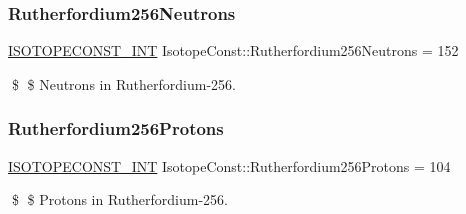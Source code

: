 \subsubsection{\texorpdfstring{Rutherfordium256\+Neutrons}{Rutherfordium256Neutrons}}
{\footnotesize\ttfamily \mbox{\hyperlink{group___isotope_const-_macros_ga5f18360b3e99483a35c32d789e62621c}{I\+S\+O\+T\+O\+P\+E\+C\+O\+N\+S\+T\+\_\+\+I\+NT}} Isotope\+Const\+::\+Rutherfordium256\+Neutrons = 152}

\$ \$ Neutrons in Rutherfordium-\/256. \mbox{\label{group___isotope_const-_rutherfordium-_rf256_gaf3d54291743192c187e2b59538371070}} 
\subsubsection{\texorpdfstring{Rutherfordium256\+Protons}{Rutherfordium256Protons}}
{\footnotesize\ttfamily \mbox{\hyperlink{group___isotope_const-_macros_ga5f18360b3e99483a35c32d789e62621c}{I\+S\+O\+T\+O\+P\+E\+C\+O\+N\+S\+T\+\_\+\+I\+NT}} Isotope\+Const\+::\+Rutherfordium256\+Protons = 104}

\$ \$ Protons in Rutherfordium-\/256. 